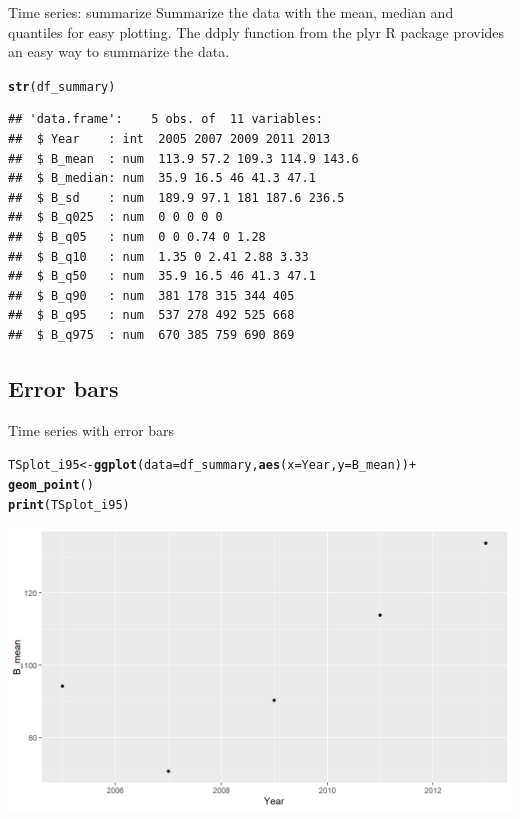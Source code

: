 \documentclass{beamer}\usepackage[]{graphicx}\usepackage[]{color}
\makeatletter
\newcommand{\hlopt}[1]{\textcolor[rgb]{0,0,0}{#1}}%
\newcommand{\hlstd}[1]{\textcolor[rgb]{0.345,0.345,0.345}{#1}}%
\newcommand{\hlkwb}[1]{\textcolor[rgb]{0.69,0.353,0.396}{#1}}%
\newcommand{\hlkwc}[1]{\textcolor[rgb]{0.333,0.667,0.333}{#1}}%
\newcommand{\hlkwd}[1]{\textcolor[rgb]{0.737,0.353,0.396}{\textbf{#1}}}%
\newenvironment{kframe}{%
 \def\at@end@of@kframe{}%
 \ifinner\ifhmode%
  \def\at@end@of@kframe{\end{minipage}}%
  \begin{minipage}{\columnwidth}%
 \fi\fi%
 \def\FrameCommand##1{\hskip\@totalleftmargin \hskip-\fboxsep
 \colorbox{shadecolor}{##1}\hskip-\fboxsep
     \hskip-\linewidth \hskip-\@totalleftmargin \hskip\columnwidth}%
 \MakeFramed {\advance\hsize-\width
   \@totalleftmargin\z@ \linewidth\hsize
   \@setminipage}}%
 {\par\unskip\endMakeFramed%
 \at@end@of@kframe}
\newenvironment{knitrout}{}{} %
\makeatother
\begin{document}
\begin{frame}[fragile]{Time series: summarize}
Summarize the data with the mean, median and quantiles for easy plotting.
The ddply function from the plyr R package provides an easy way to summarize the data.
\begin{knitrout}\footnotesize
{}\color{fgcolor}\begin{kframe}
\begin{alltt}
\hlkwd{str}\hlstd{(df_summary)}
\end{alltt}
\begin{verbatim}
## 'data.frame':	5 obs. of  11 variables:
##  $ Year    : int  2005 2007 2009 2011 2013
##  $ B_mean  : num  113.9 57.2 109.3 114.9 143.6
##  $ B_median: num  35.9 16.5 46 41.3 47.1
##  $ B_sd    : num  189.9 97.1 181 187.6 236.5
##  $ B_q025  : num  0 0 0 0 0
##  $ B_q05   : num  0 0 0.74 0 1.28
##  $ B_q10   : num  1.35 0 2.41 2.88 3.33
##  $ B_q50   : num  35.9 16.5 46 41.3 47.1
##  $ B_q90   : num  381 178 315 344 405
##  $ B_q95   : num  537 278 492 525 668
##  $ B_q975  : num  670 385 759 690 869
\end{verbatim}
\end{kframe}
\end{knitrout}
\end{frame}


\subsection{Error bars}

\begin{frame}[fragile]{Time series with error bars}
\begin{knitrout}\footnotesize
{}\color{fgcolor}\begin{kframe}
\begin{alltt}
\hlstd{TSplot_i95} \hlkwb{<-} \hlkwd{ggplot}\hlstd{(}\hlkwc{data}\hlstd{=df_summary,} \hlkwd{aes}\hlstd{(}\hlkwc{x}\hlstd{=Year,} \hlkwc{y}\hlstd{=B_mean))} \hlopt{+}
  \hlkwd{geom_point}\hlstd{()}
\hlkwd{print}\hlstd{(TSplot_i95)}
\end{alltt}
\end{kframe}

{\centering \includegraphics[width=.9\linewidth]{figure/sp_TSplot_i95a-1} 

}



\end{knitrout}
\end{frame}
\end{document}
